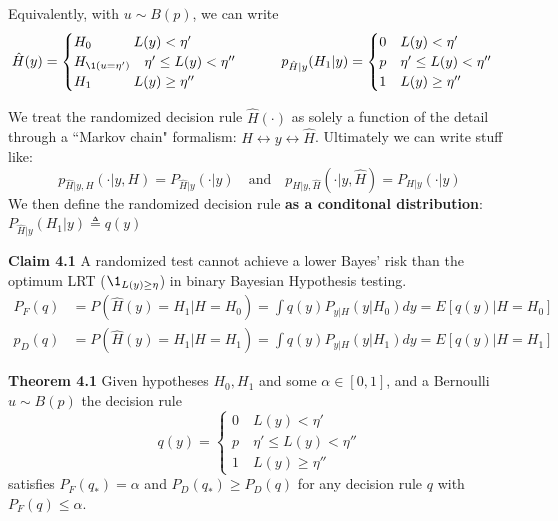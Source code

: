 \documentclass[12pt]{article} %
\begin{document}
Equivalently, with $u \sim B(p)$, we can write
\begin{equation*}
    \hat{H}(y) = 
    \begin{cases}
        H_0 \qquad \quad L(y) < \eta' \\
        H_{\1(u = \eta')} \quad \eta' \leq L(y) < \eta'' \\
        H_1 \qquad \quad  L(y) \geq \eta''
    \end{cases}
    \qquad
    p_{\hat{H}|y} (H_1|y) =
    \begin{cases}
        0 \quad L(y) < \eta' \\
        p \quad \eta' \leq L(y) < \eta'' \\
        1 \quad  L(y) \geq \eta''
    \end{cases}
\end{equation*}

\separate

We treat the randomized decision rule $\hat{H}(\cdot)$ as solely a function of the detail through a ``Markov chain" formalism: $H \leftrightarrow y \leftrightarrow \hat{H}$. Ultimately we can write stuff like:
\begin{equation*}
    p_{\hat{H}|y,H}(\cdot| y,H) = P_{\hat{H}|y}(\cdot|y) \quad \text{and} \quad 
    p_{H|y,\hat{H}}(\cdot| y,\hat{H}) = P_{H|y}(\cdot|y)
\end{equation*}
We then define the randomized decision rule \textbf{as a conditonal distribution}:
$P_{\hat{H}|y}(H_1|y) \triangleq q(y)$

\textbf{Claim 4.1} A randomized test cannot achieve a lower Bayes' risk than the optimum LRT ($\1_{L(y) \geq \eta}$) in binary Bayesian Hypothesis testing.
\begin{align*}
    P_F(q) &= P(\hat{H}(y) = H_1 | H = H_0) = \int q(y) P_{y|H}(y|H_0) dy = E[q(y)| H = H_0] \\
    p_D(q) &= P(\hat{H}(y) = H_1 | H = H_1) = \int q(y) P_{y|H}(y|H_1) dy = E[q(y)| H = H_1]
\end{align*}

\textbf{Theorem 4.1} Given hypotheses $H_0,H_1$ and some $\alpha \in [0,1]$, and a Bernoulli $u \sim B(p)$ the decision rule
\begin{equation*}
    q(y) =
    \begin{cases}
        0 \quad L(y) < \eta' \\
        p \quad \eta' \leq L(y) < \eta'' \\
        1 \quad  L(y) \geq \eta''
    \end{cases}
\end{equation*}
satisfies $P_F(q_*) = \alpha$ and $P_D(q_*) \geq P_D(q)$ for any decision rule $q$ with $P_F(q) \leq \alpha$.
\end{document}
